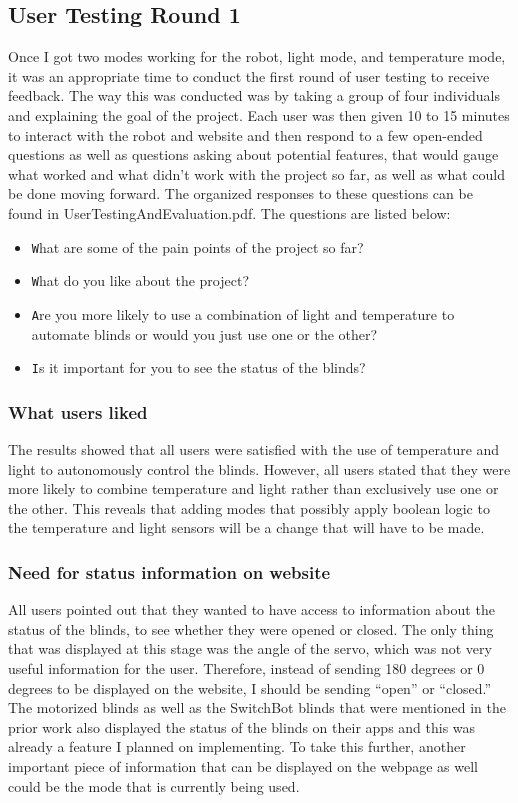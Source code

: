 \documentclass[10pt,twocolumn]{article}
\begin{document}
\subsection{User Testing Round 1}
Once I got two modes working for the robot, light mode, and temperature mode, it was an appropriate time to conduct the first round of user testing to receive feedback. The way this was conducted was by taking a group of four individuals and explaining the goal of the project. Each user was then given 10 to 15 minutes to interact with the robot and website and then respond to a few open-ended questions as well as questions asking about potential features, that would gauge what worked and what didn’t work with the project so far, as well as what could be done moving forward. The organized responses to these questions can be found in UserTestingAndEvaluation.pdf. The questions are listed below:

\begin{itemize}
    \item \texttt What are some of the pain points of the project so far?
    \item \texttt What do you like about the project?
    \item \texttt Are you more likely to use a combination of light and temperature to automate blinds or would you just use one or the other?
    \item \texttt Is it important for you to see the status of the blinds?
\end{itemize}

\subsubsection{What users liked}
The results showed that all users were satisfied with the use of temperature and light to autonomously control the blinds. However, all users stated that they were more likely to combine temperature and light rather than exclusively use one or the other. This reveals that adding modes that possibly apply boolean logic to the temperature and light sensors will be a change that will have to be made.

\subsubsection{Need for status information on website}
All users pointed out that they wanted to have access to information about the status of the blinds, to see whether they were opened or closed. The only thing that was displayed at this stage was the angle of the servo, which was not very useful information for the user. Therefore, instead of sending 180 degrees or 0 degrees to be displayed on the website, I should be sending “open” or “closed.” The motorized blinds as well as the SwitchBot blinds that were mentioned in the prior work also displayed the status of the blinds on their apps and this was already a feature I planned on implementing. To take this further, another important piece of information that can be displayed on the webpage as well could be the mode that is currently being used.
\end{document}

